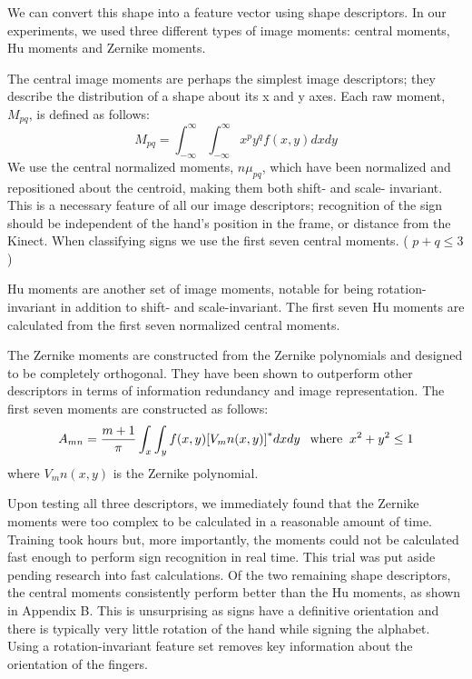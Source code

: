 \documentclass[12pt]{article}
\begin{document}
We can convert this shape into a feature vector using shape descriptors. In our experiments, we used three different types of image moments: central moments, Hu moments and Zernike moments.

The central image moments are perhaps the simplest image descriptors; they describe the distribution of a shape about its x and y axes. Each raw moment, \(M_{pq}\), is defined as follows:
\begin{equation*}
M_{pq} = \int_{-\infty}^\infty \int_{-\infty}^\infty x^p y^q f(x,y) dxdy
\end{equation*}
We use the central normalized moments, \({n\mu}_{pq}\), which have been normalized and repositioned about the centroid, making them both shift- and scale- invariant. This is a necessary feature of all our image descriptors; recognition of the sign should be independent of the hand’s position in the frame, or distance from the Kinect.  When classifying signs we use the first seven central moments. ( \(p+q \leq 3\) )

Hu moments are another set of image moments, notable for being rotation-invariant in addition to shift- and scale-invariant. The first seven Hu moments are calculated from the first seven normalized central moments.

The Zernike moments are constructed from the Zernike polynomials and designed to be completely orthogonal. They have been shown to outperform other descriptors in terms of information redundancy and image representation. \cite{Teh} The first seven moments are constructed as follows:
\begin{equation*}
A_{mn} = \frac{m+1}{\pi} \int_x \int_y f(x,y){\left [{V_mn}(x,y) \right ]}^* dxdy \text{\: \:where\: } x^2 + y^2 \leq 1
\end{equation*}
where \({V_mn}(x,y)\) is the Zernike polynomial.

Upon testing all three descriptors, we immediately found that the Zernike moments were too complex to be calculated in a reasonable amount of time. Training took hours but, more importantly, the moments could not be calculated fast enough to perform sign recognition in real time. This trial was put aside pending research into fast calculations. Of the two remaining shape descriptors, the central moments consistently perform better than the Hu moments, as shown in Appendix B. This is unsurprising as signs have a definitive orientation and there is typically very little rotation of the hand while signing the alphabet. Using a rotation-invariant feature set removes key information about the orientation of the fingers. 
\end{document}
